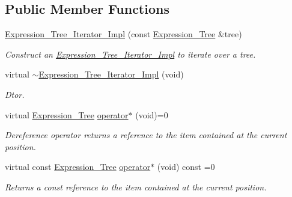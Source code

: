 \subsection*{Public Member Functions}
\begin{DoxyCompactItemize}
\item 
\hyperlink{classMadara_1_1Expression__Tree_1_1Expression__Tree__Iterator__Impl_a45bc724a98e8d395ffb921da9760e945}{Expression\_\-Tree\_\-Iterator\_\-Impl} (const \hyperlink{classMadara_1_1Expression__Tree_1_1Expression__Tree}{Expression\_\-Tree} \&tree)
\begin{DoxyCompactList}\small\item\em Construct an \hyperlink{classMadara_1_1Expression__Tree_1_1Expression__Tree__Iterator__Impl}{Expression\_\-Tree\_\-Iterator\_\-Impl} to iterate over a tree. \item\end{DoxyCompactList}\item 
virtual \hyperlink{classMadara_1_1Expression__Tree_1_1Expression__Tree__Iterator__Impl_a264ffe1fc5ea7956a0a9c7f0bfbf7a96}{$\sim$Expression\_\-Tree\_\-Iterator\_\-Impl} (void)
\begin{DoxyCompactList}\small\item\em Dtor. \item\end{DoxyCompactList}\item 
virtual \hyperlink{classMadara_1_1Expression__Tree_1_1Expression__Tree}{Expression\_\-Tree} \hyperlink{classMadara_1_1Expression__Tree_1_1Expression__Tree__Iterator__Impl_aaec2964459ca6f0226f3e0dabda54288}{operator$\ast$} (void)=0
\begin{DoxyCompactList}\small\item\em Dereference operator returns a reference to the item contained at the current position. \item\end{DoxyCompactList}\item 
virtual const \hyperlink{classMadara_1_1Expression__Tree_1_1Expression__Tree}{Expression\_\-Tree} \hyperlink{classMadara_1_1Expression__Tree_1_1Expression__Tree__Iterator__Impl_a0adf08a25890d38df2b6a8615ba47b9d}{operator$\ast$} (void) const =0
\begin{DoxyCompactList}\small\item\em Returns a const reference to the item contained at the current position. \item\end{DoxyCompactList}\item 

\end{DoxyCompactItemize}
